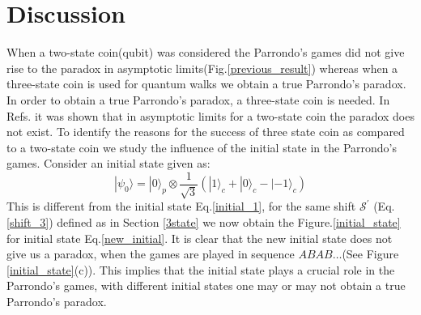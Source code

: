 \documentclass[english,aps,pra,amsmath,amssymb,showpacs,notitlepage,onecolumn]{revtex4-1}
\begin{document}
\section{Discussion}\label{discussion}

When a two-state coin(qubit) was considered the Parrondo's games did not give rise to the paradox in asymptotic limits(Fig.\ref{previous_result}) whereas when a three-state coin is used for quantum walks we obtain a true Parrondo's paradox. In order to obtain a true Parrondo's paradox, a three-state coin is needed. In Refs.\cite{minli,flitney} it was shown that in asymptotic limits for a two-state coin the paradox does not exist. To identify the reasons for the success of three state coin as compared to a two-state coin we study the influence of the initial state in the Parrondo's games. Consider an initial state given as:
\begin{equation}\label{new_initial}
|\psi_0 \rangle = | 0 \rangle_p \otimes \frac{1}{\sqrt{3}}(| 1 \rangle_c +| 0 \rangle_c - | -1 \rangle_c)
\end{equation} 
This is different from the initial state Eq.\ref{initial_1}, 
for the same shift $\mathcal{S^{\prime}}$ (Eq.\ref{shift_3}) defined as in Section \ref{3state} we now obtain the Figure.\ref{initial_state} for initial state Eq.\ref{new_initial}. It is clear that the new initial state does not give us a paradox, when the games are played in sequence $ABAB\ldots$(See Figure \ref{initial_state}(c)). This implies that the initial state plays a crucial role in the Parrondo's games, with different initial states one may or may not obtain a true Parrondo's paradox.\\
\end{document}
